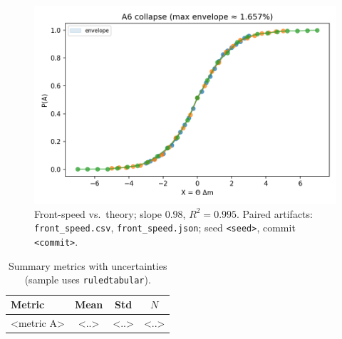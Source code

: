 \documentclass[%
 reprint,                %
 superscriptaddress,     %
 aps,                    %
 prx,                    %
]{revtex4-2}
\begin{document}
\begin{figure}[t]
  \centering
  \includegraphics[width=\linewidth]{fig_1} %
  \caption{Front-speed vs.\ theory; slope $0.98$, $R^2=0.995$.
  Paired artifacts: \texttt{front\_speed.csv}, \texttt{front\_speed.json};
  seed \texttt{<seed>}, commit \texttt{<commit>}.}
  \label{fig:frontspeed}
\end{figure}

\begin{table}[t]
  \caption{Summary metrics with uncertainties (sample uses \texttt{ruledtabular}).}
  \label{tab:summary}
  \begin{ruledtabular}
  \begin{tabular}{lccc}
    Metric & Mean & Std & $N$ \\
    \hline
    <metric A> & <..> & <..> & <..> \\
  \end{tabular}
  \end{ruledtabular}
\end{table}


\end{document}
